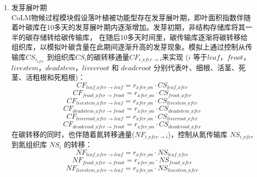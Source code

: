 \begin{enumerate}
\renewcommand{\theenumi}{\alph{enumi}}
\item 发芽展叶期\\
CoLM物候过程模块假设落叶植被功能型存在发芽展叶期，即叶面积指数伴随着叶碳库在10多天的发芽展叶期内逐渐增加。发芽初期，非结构存储库将其一半的碳存储转给碳传输库，
在随后10多天时间里，碳传输库逐渐将碳转移给组织库，以模拟叶碳含量在此期间逐渐升高的发芽现象。模拟上通过控制从传输库$CS_{i_{xfer}}$
到组织库$CS_i$的碳转移通量$CF_{i\_xfer\rightarrow i}$来实现
($i$ 等于$leaf$，$froot$，$livestem$，$deadstem$，$livecroot$ 和
$deadcroot$ 分别代表叶、细根、活茎、死茎、活粗根和死粗根)：
\begin{equation}
  CF_{leaf\_xfer\rightarrow leaf} = r_{{xfer}\_{on}}\cdot CS_{leaf\_{xfer}}\ 
\end{equation}
\begin{equation}
  CF_{froot\_{xfer}\rightarrow froot} = r_{{xfer}\_{on}}\cdot CS_{froot\_{xfer}}\ 
\end{equation}
\begin{equation}
  CF_{livestem\_{xfer}\rightarrow leaf} = r_{{xfer}\_{on}}\cdot CS_{livestem\_{xfer}}\ 
\end{equation}
\begin{equation}
  CF_{deadstem\_{xfer}\rightarrow froot} = r_{{xfer}\_{on}}\cdot CS_{deadstem\_{xfer}}\ 
\end{equation}
\begin{equation}
  CF_{livecroot\_{xfer}\rightarrow leaf} = r_{{xfer}\_{on}}\cdot CS_{livecroot\_{xfer}}\ 
\end{equation}
\begin{equation}
  CF_{deadcroot\_{xfer}\rightarrow froot} = r_{{xfer}\_{on}}\cdot CS_{deadcroot\_{xfer}}\ 
\end{equation}
在碳转移的同时，也伴随着氮转移通量($NF_{i\_{xfer}\rightarrow i}$)，控制从氮传输库 $NS_{i\_{xfer}}$ 到氮组织库 $NS_{i}$ 的转移：
\begin{equation}
  NF_{leaf\_{xfer}\rightarrow leaf} = r_{{xfer}\_{on}}\cdot NS_{leaf\_{xfer}}\ 
\end{equation}
\begin{equation}
  NF_{froot\_{xfer}\rightarrow froot} = r_{{xfer}\_{on}}\cdot NS_{froot\_{xfer}}\ 
\end{equation}
\begin{equation}
  NF_{livestem\_{xfer}\rightarrow leaf} = r_{{xfer}\_{on}}\cdot NS_{livestem\_{xfer}}\ 
\end{equation}
\begin{equation}

\end{equation}
\end{enumerate}
